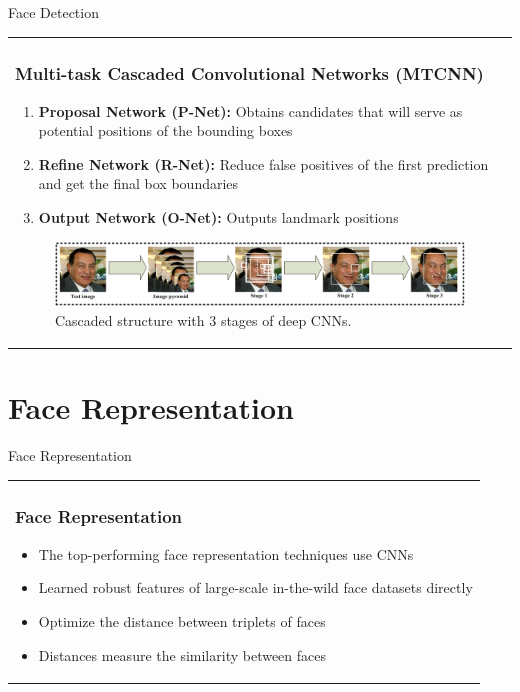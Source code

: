 \documentclass[11pt]{beamer}
\begin{document}
\begin{frame}{Face Detection}
\begin{tabular}{l}
\parbox{1\linewidth}{
\frametitle{Multi-task Cascaded Convolutional Networks (MTCNN)}


\begin{enumerate}
\item \textbf{Proposal Network (P-Net):} Obtains candidates that will serve as potential positions of the bounding boxes

\item \textbf{Refine Network (R-Net):} Reduce false positives of the first prediction and get the final box boundaries

\item \textbf{Output Network (O-Net):} Outputs landmark positions 

\end{enumerate}
\begin{figure}[!tbp]
 \centering
    \includegraphics[width=\columnwidth]{figures/mtcnn_pipeline2.png}
    \caption{Cascaded structure with 3 stages of deep CNNs. \cite{zhang}}
	\label{fig:mtcnn}
\end{figure}
}
\end{tabular}  
\end{frame}

\section{Face Representation}
\begin{frame}{Face Representation}
\begin{tabular}{l}
\parbox{1\linewidth}{
\frametitle{Face Representation}
\begin{itemize}
\item The top-performing face representation techniques use CNNs \item Learned robust features of large-scale in-the-wild face datasets directly
\item Optimize the distance between triplets of faces
\item Distances measure the similarity between faces 
\end{itemize}
}
\end{tabular}  
\end{frame}
\end{document}
